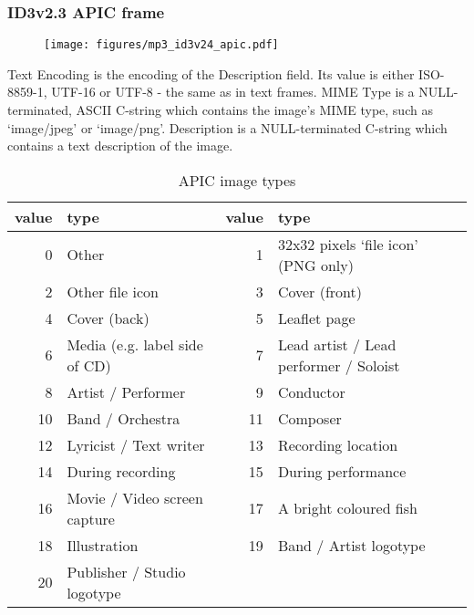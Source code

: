 \pagebreak

\subsubsection{ID3v2.3 APIC frame}
\begin{figure}[h]
\texttt{[image: figures/mp3\_id3v24\_apic.pdf]}
\end{figure}
\par
\noindent
Text Encoding is the encoding of the Description field.
Its value is either ISO-8859-1, UTF-16 or UTF-8 - the same as in
text frames.
MIME Type is a NULL-terminated, ASCII C-string which contains the
image's MIME type, such as `image/jpeg' or `image/png'.
Description is a NULL-terminated C-string which contains
a text description of the image.
\begin{table}[h]
{
\begin{tabular}{|r|l||r|l|}
\hline
value & type & value & type \\
\hline
0 & Other & 1 & 32x32 pixels `file icon' (PNG only) \\
2 & Other file icon & 3 & Cover (front) \\
4 & Cover (back) & 5 & Leaflet page \\
6 & Media (e.g. label side of CD) & 7 & Lead artist / Lead performer / Soloist \\
8 & Artist / Performer & 9 & Conductor \\
10 & Band / Orchestra & 11 & Composer \\
12 & Lyricist / Text writer & 13 & Recording location \\
14 & During recording & 15 & During performance \\
16 & Movie / Video screen capture & 17 & A bright coloured fish \\
18 & Illustration & 19 & Band / Artist logotype \\
20 & Publisher / Studio logotype & &  \\
\hline
\end{tabular}
\caption{APIC image types}
}
\end{table}
